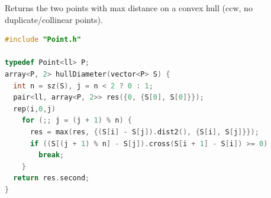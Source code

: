 Returns the two points with max distance on a convex hull (ccw, no duplicate/collinear points).
\begin{lstlisting}[style=codebook, language=C++]
#include "Point.h"

typedef Point<ll> P;
array<P, 2> hullDiameter(vector<P> S) {
  int n = sz(S), j = n < 2 ? 0 : 1;
  pair<ll, array<P, 2>> res({0, {S[0], S[0]}});
  rep(i,0,j)
    for (;; j = (j + 1) % n) {
      res = max(res, {(S[i] - S[j]).dist2(), {S[i], S[j]}});
      if ((S[(j + 1) % n] - S[j]).cross(S[i + 1] - S[i]) >= 0)
        break;
    }
  return res.second;
}

\end{lstlisting}
